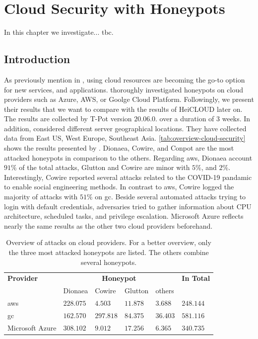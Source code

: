 \chapter{Cloud Security with Honeypots}

In this chapter we investigate... tbc.

\section{Introduction}

As previously mention in , using cloud resources are becoming the go-to option for new services, and applications.
\citet{Kelly2021} thoroughly investigated honeypots on cloud providers such as Azure, AWS, or Goolge Cloud Platform.
Followingly, we present their results that we want to compare with the results of HeiCLOUD later on.
The results are collected by T-Pot version $20.06.0.$ over a duration of 3 weeks.
In addition, \citet{Kelly2021} considered different server geographical locations.
They have collected data from East US, West Europe, Southeast Asia.
\autoref{tab:overview-cloud-security} shows the results presented by \citet{Kelly2021}.
Dionaea, Cowire, and Conpot are the most attacked honeypots in comparison to the others.
Regarding \ac{aws}, Dionaea account $91\%$ of the total attacks, Glutton and Cowire are minor with $5\%$, and $2\%$.
Interestingly, Cowire reported several attacks related to the COVID-19 pandamic to enable social engineering methods.
In contrast to \ac{aws}, Cowire logged the majority of attacks with $51\%$ on \ac{gc}.
Beside several automated attacks trying to login with default credentials, adversaries tried to gather information about CPU architecture, scheduled tasks, and privilege escalation.
Microsoft Azure reflects nearly the same results as the other two cloud providers beforehand.

\begin{table}
    \centering
    \caption[Overview of attacks on cloud providers]{Overview of attacks on cloud providers. For a better overview, only the three most attacked honeypots are listed. The others combine several honeypots.}
    \begin{tabular}{l|llll|l}
        \toprule
        \textbf{Provider} & \multicolumn{4}{c|}{\textbf{Honeypot}} & \textbf{In Total}                                   \\
                          & Dionaea                                & Cowire            & Glutton  & others   &           \\
        \hline
        \acl{aws}         & $228.075$                              & $4.503$           & $11.878$ & $3.688$  & $248.144$ \\
        \acl{gc}          & $162.570$                              & $297.818$         & $84.375$ & $36.403$ & $581.116$ \\
        Microsoft Azure   & $308.102$                              & $9.012$           & $17.256$ & $6.365$  & $340.735$ \\
        \bottomrule
    \end{tabular}
    \label{tab:overview-cloud-security}
\end{table}

